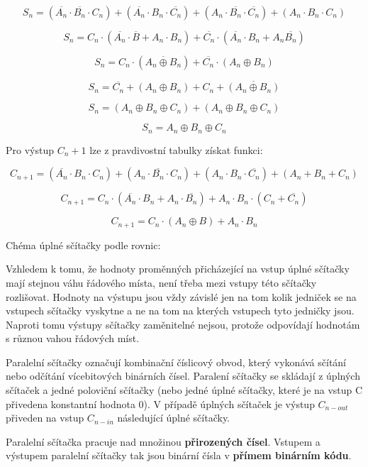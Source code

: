 $$ S_n = (\overline{A_n} \cdot \overline{B_n} \cdot C_n) + (\overline{A_n} \cdot B_n \cdot\overline{C_n}) + (A_n \cdot \overline{B_n}\cdot \overline{C_n}) + (A_n \cdot B_n \cdot C_n) $$

$$ S_n = C_n\cdot(\overline{A_n}\cdot\overline{B}+A_n\cdot B_n)+\overline{C_n}\cdot(\overline{A_n}\cdot B_n + A_n \overline{B_n}) $$

$$ S_n = C_n\cdot (\overline{A_n \oplus B_n}) + \overline{C_n}\cdot (A_n \oplus B_n) $$

$$ S_n = \overline{C_n} + (A_n \oplus B_n) + C_n + \overline{(A_n \oplus B_n)} $$

$$ S_n = (A_n \oplus B_n \oplus C_n) + (A_n \oplus B_n \oplus C_n)  $$

$$S_n = A_n \oplus B_n \oplus C_n $$

Pro výstup $C_n+1$ lze z pravdivostní tabulky získat funkci:

$$ C_{n+1} = (\overline{A_n}\cdot B_n \cdot C_n) + (A_n \cdot\overline{B_n}\cdot C_n)+(A_n\cdot B_n\cdot\overline{C_n})+(A_n+B_n+C_n)$$

$$ C_{n+1} = C_n \cdot(\overline{A_n}\cdot B_n + A_n \cdot \overline{B_n})+A_n \cdot B_n \cdot (C_n +\overline{C_n})$$

$$ C_{n+1} = C_n \cdot (A_n \oplus B) + A_n \cdot B_n $$

Chéma úplné sčítačky podle rovnic:

\vskip 4mm
\centerline{}
\vskip 4mm

Vzhledem k tomu, že hodnoty proměnných přicházející na vstup úplné sčítačky mají stejnou váhu řádového místa, není třeba mezi vstupy této sčítačky rozlišovat. Hodnoty na výstupu jsou vždy závislé jen na tom kolik jedniček se na vstupech sčítačky vyskytne a ne na tom na kterých vstupech tyto jedničky jsou. Naproti tomu výstupy sčítačky zaměnitelné nejsou, protože odpovídají hodnotám s různou vahou řádových míst. 


Paralelní sčítačky označují kombinační číslicový obvod, který vykonává sčítání nebo odčítání vícebitových binárních čísel. Paralení sčítačky se skládají z úplných sčítaček a jedné poloviční sčítačky (nebo jedné úplné sčítačky, které je na vstup C přivedena konstantní hodnota 0). V případě úplných sčítaček je výstup $C_{n-out}$ přiveden na vstup $C_{n-in}$ následující úplné sčítačky.

\vskip 4mm
\centerline{}
\vskip 4mm

Paralelní sčítačka pracuje nad množinou {\bf přirozených čísel}. Vstupem a výstupem paralelní sčítačky tak jsou binární čísla v {\bf přímem binárním kódu}.

